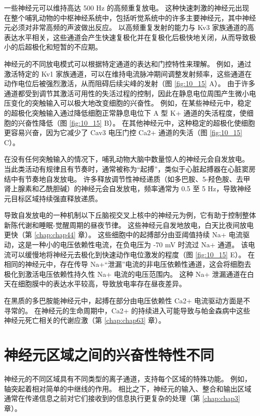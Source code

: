 一些神经元可以维持高达 500 Hz 的高频重复放电。 
这种快速刺激的神经元出现在整个哺乳动物的中枢神经系统中，包括听觉系统中的许多主要神经元，其中神经元必须对非常高频的声波做出反应。 
以高频重复发射的能力与 Kv3 家族通道的高表达水平相关，这些通道会产生快速复极化并在复极化后极快地关闭，从而导致极小的后超极化和短暂的不应期。


神经元的不同放电模式可以根据特定通道的表达和门控特性来理解。 
例如，通过激活特定的 Kv1 家族通道，可以在维持电流脉冲期间调整发射频率，这些通道在动作电位后被强烈激活，从而阻碍后续尖峰的发射（图 \ref{fig:10_15} A）。 
由于许多通道都受到调节其激活可用性的失活过程的控制，因此在静息电位周围产生微小电压变化的突触输入可以极大地改变细胞的兴奋性。 
例如，在某些神经元中，稳定的超极化突触输入通过降低细胞正常静息电位下 A 型 K+ 通道的失活程度，使细胞的兴奋性降低（图 \ref{fig:10_15} B）。 
在其他神经元中，这种稳定的超极化使细胞更容易兴奋，因为它减少了 Cav3 电压门控 Ca2+ 通道的失活（图 \ref{fig:10_15} C）。


在没有任何突触输入的情况下，哺乳动物大脑中数量惊人的神经元会自发放电。 
当此类活动有规律且有节奏时，通常被称为“起搏”，类似于心脏起搏器在心脏窦房结中有节奏地自发放电。 
许多释放调节性神经递质（如多巴胺、5-羟色胺、去甲肾上腺素和乙酰胆碱）的神经元会自发放电，频率通常为 0.5 至 5 Hz，导致神经元目标区域持续强直释放递质。


导致自发放电的一种机制以下丘脑视交叉上核中的神经元为例，它有助于控制整体新陈代谢和睡眠-觉醒周期的昼夜节律。 
这些神经元自发地放电，白天比夜间放电更快（第 \ref{chap:chap44} 章）。 
这些细胞中的起搏部分由亚阈值持续 Na+ 电流驱动，这是一种小的电压依赖性电流，在负电压为 -70 mV 时流过 Na+ 通道。 
该电流可以缓慢地将神经元去极化到快速动作电位激发的程度（图 \ref{fig:10_15} E）。 
在相同的神经元中，存在传导 Na+“泄漏”电流的非电压依赖性通道，这会将细胞去极化到激活电压依赖性持久性 Na+ 电流的电压范围内。 
这种 Na+ 泄漏通道在白天在细胞膜中的表达水平较高，导致放电率存在昼夜差异。


在黑质的多巴胺能神经元中，起搏在部分由电压依赖性 Ca2+ 电流驱动方面是不寻常的。 
在神经元的生命周期中，Ca2+ 的持续进入可能导致与帕金森病中这些神经元死亡相关的代谢应激（第 \ref{chap:chap63} 章）。


\section{神经元区域之间的兴奋性特性不同}
神经元的不同区域具有不同类型的离子通道，支持每个区域的特殊功能。 
例如，轴突起着相对简单的中继线的作用。 
相比之下，神经元的输入、整合和输出区域通常在传递信息之前对它们接收到的信息执行更复杂的处理（第 \ref{chap:chap3}章）。


